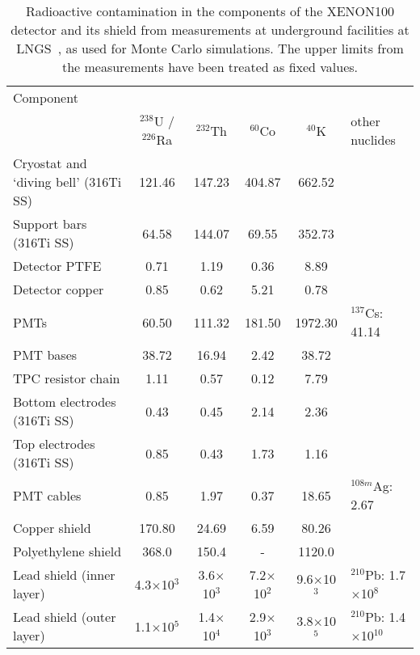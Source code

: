 \begin{table}[!t]
\centering
\caption[Radioactive contamination in the materials used to construct the XENON100 detector and shield ]{Radioactive contamination in the components of the XENON100 detector and its shield from measurements at underground facilities at LNGS~\cite{ScreeningPaper}, as used for Monte Carlo simulations. The upper limits from the measurements have been treated as fixed values.}
\label{tabScreeningResults}
\begin{tabular}{>{\footnotesize}l|>{\footnotesize}c|>{\footnotesize}c|>{\footnotesize}c|>{\footnotesize}c|>{\footnotesize}l}
\hline
Component 					& \multicolumn{5}{>{\footnotesize}c}{Total radioactive contamination [mBq]} \\
							& $^{238}$U / $^{226}$Ra	& $^{232}$Th 	 	& $^{60}$Co 	 	& $^{40}$K 	 	& other nuclides \\
\hline
Cryostat and `diving bell' (316Ti SS) 	& 121.46			& 147.23			& 404.87			& 662.52			&\\
Support bars (316Ti SS) 			& 64.58 			& 144.07			& 69.55 			& 352.73 			&\\
Detector PTFE 					& 0.71 			& 1.19			& 0.36			& 8.89 			&\\
Detector copper 				& 0.85 			& 0.62 			& 5.21 			& 0.78 			&\\
PMTs						& 60.50			& 111.32			& 181.50 			& 1972.30 		& $^{137}$Cs: 41.14 \\
PMT bases 					& 38.72			& 16.94			& 2.42			& 38.72 			&\\
TPC resistor chain 				& 1.11 			& 0.57			& 0.12			& 7.79 			&\\
Bottom electrodes (316Ti SS) 		& 0.43			& 0.45 			& 2.14			& 2.36 			&\\
Top electrodes (316Ti SS) 		& 0.85			& 0.43 			& 1.73 			& 1.16 			&\\
PMT cables					& 0.85 			& 1.97			& 0.37 			& 18.65 			& $^{108m}$Ag: 2.67 \\
\hline
Copper shield 					& 170.80 			& 24.69			& 6.59 			& 80.26			&\\ 
Polyethylene shield 				& 368.0 			& 150.4 			& - 				& 1120.0 		&\\
Lead shield  (inner layer) 			& 4.3$\times$10$^{3}$ 		& 3.6$\times$10$^{3}$			& 7.2$\times$10$^{2}$ 			& 9.6$\times$10$^{3}$ 		& $^{210}$Pb: 1.7$\times$10$^{8}$ \\
Lead shield (outer layer) 			& 1.1$\times$10$^{5}$		& 1.4$\times$10$^{4}$			& 2.9$\times$10$^{3}$			& 3.8$\times$10$^{5}$			& $^{210}$Pb: 1.4$\times$10$^{10}$ \\
\hline
\end{tabular}
\end{table}

